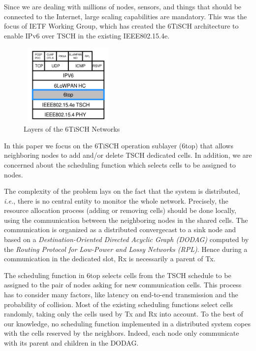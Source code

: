 \documentclass[10pt, conference, compsocconf]{IEEEtran}
\begin{document}
Since we are dealing with millions of nodes, sensors, and things that should be connected to the Internet, large scaling capabilities are mandatory. This was the focus of IETF Working Group, which has created the 6TiSCH architecture to enable IPv6 over TSCH in the existing IEEE802.15.4e.
\begin{figure}[h]
    \centering
    \includegraphics[width=4.77cm, height=4cm]{layers.png}
    \caption{Layers of the 6TiSCH Networks}
    \label{fig:Layers of the 6TiSCH Networks}
\end{figure}

In this paper we focus on the 6TiSCH operation sublayer (6top) that  allows neighboring nodes to add and/or delete TSCH dedicated cells. In addition, we are concerned about the scheduling function which selects cells to be assigned to nodes.

 The complexity of the problem lays on the fact that the system is distributed, {\em i.e.}, there is no central entity to monitor the whole network. Precisely, the resource allocation process (adding or removing cells) should be done locally, using the communication between the neighboring nodes in the shared cells. The communication is organized as a distributed convergecast to a sink node and based on a {\em Destination-Oriented Directed Acyclic Graph (DODAG)} computed by the  {\em Routing Protocol for Low-Power and Lossy Networks (RPL)}. Hence during a communication in the dedicated slot, Rx is necessarily a parent of Tx.  

The scheduling function in 6top selects cells from the TSCH schedule to be assigned to the pair of nodes asking for new communication cells. This process has to consider many factors, like latency on end-to-end transmission and the probability of collision. Most of the existing scheduling functions select cells randomly, taking only the cells used by Tx and Rx into account. To the best of our knowledge, no scheduling function implemented in a distributed system copes with the cells reserved by the neighbors. Indeed, each node only communicate with its parent and children in the DODAG.   
\end{document}
